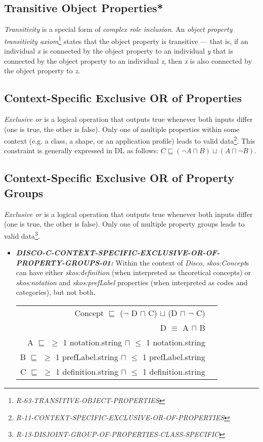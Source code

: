 \documentclass{llncs}
\newcommand{\ms}[1]{\texttt{#1}}
\newenvironment{DL}{
  \vspace{0cm}
  \begin{tabular}{r l}

}{
  \end{tabular}
}
\begin{document}
\subsection{Transitive Object Properties*}

\emph{Transitivity} is a special form of \emph{complex role inclusion}.
An \emph{object property transitivity axiom}\footnote{\emph{R-63-TRANSITIVE-OBJECT-PROPERTIES}} states that the object property is transitive — that is, if an individual \emph{x} is connected by the object property to an individual \emph{y} that is connected by the object property to an individual \emph{z}, then \emph{x} is also connected by the object property to \emph{z}.

\subsection{Context-Specific Exclusive OR of Properties}		

\emph{Exclusive or} is a logical operation that outputs true whenever both inputs differ (one is true, the other is false).
Only one of multiple properties within some context (e.g. a class, a shape, or an  application profile) leads to valid data\footnote{\emph{R-11-CONTEXT-SPECIFIC-EXCLUSIVE-OR-OF-PROPERTIES}}.
This constraint is generally expressed in DL as follows: \ms{$C \sqsubseteq (\neg A \sqcap B) \sqcup (A \sqcap \neg B)$}.

\subsection{Context-Specific Exclusive OR of Property Groups}

\emph{Exclusive or} is a logical operation that outputs true whenever both inputs differ (one is true, the other is false).
Only one of multiple property groups leads to valid data\footnote{{\em R-13-DISJOINT-GROUP-OF-PROPERTIES-CLASS-SPECIFIC}}.

\begin{itemize}
	\item \textbf{{\em DISCO-C-CONTEXT-SPECIFIC-EXCLUSIVE-OR-OF-PROPERTY-GROUPS-01:}}
Within the context of \emph{Disco}, \emph{skos:Concept}s can have either \emph{skos:definition} (when interpreted as theoretical concepts) or \emph{skos:notation} and \emph{skos:prefLabel} properties (when interpreted as codes and categories), but not both.

\begin{DL}
Concept $\sqsubseteq$ ($\neg$ D $\sqcap$ C) $\sqcup$ (D $\sqcap$ $\neg$ C) \\ 
D $\equiv$ A $\sqcap$ B \\
A $\sqsubseteq$ $\geq$ 1 notation.string $\sqcap$ $\leq$ 1 notation.string \\
B $\sqsubseteq$ $\geq$ 1 prefLabel.string $\sqcap$ $\leq$ 1 prefLabel.string \\
C $\sqsubseteq$ $\geq$ 1 definition.string $\sqcap$ $\leq$ 1 definition.string \\
\end{DL}
\end{itemize}
\end{document}
